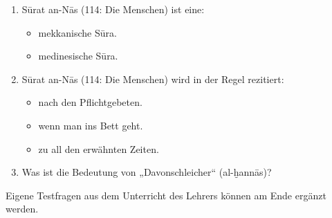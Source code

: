 \begin{enumerate}[leftmargin=1.6em,resume]
\item Sūrat an-Nās (114: Die Menschen) ist eine:
  \begin{itemize}
    \item mekkanische Sūra. \item medinesische Sūra.
  \end{itemize}
\item Sūrat an-Nās (114: Die Menschen) wird in der Regel rezitiert:
  \begin{itemize}
    \item nach den Pflichtgebeten. \item wenn man ins Bett geht.
    \item zu all den erwähnten Zeiten.
  \end{itemize}
\item Was ist die Bedeutung von „Davonschleicher“ (al-ḫannās)?
  \dotfill
\end{enumerate}

\begin{hinweis}
Eigene Testfragen aus dem Unterricht des Lehrers können am Ende ergänzt werden.
\end{hinweis}

